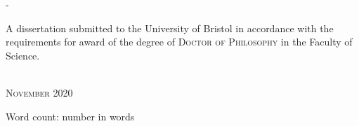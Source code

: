 \begin{titlingpage}
\begin{SingleSpace}
\begin{adjustwidth*}{\unitlength}{-\unitlength}
\begin{center}
\begin{minipage}{10cm}
A dissertation submitted to the University of Bristol in accordance with the requirements for award of the degree of \textsc{Doctor of Philosophy} in the Faculty of Science.
\end{minipage}\\
\vspace{9mm}
{\large\textsc{November 2020}}  %
\vspace{12mm}
\end{center}
\begin{flushright}
{\small Word count: number in words}  %
\end{flushright}
\end{adjustwidth*}
\end{SingleSpace}
\end{titlingpage}
